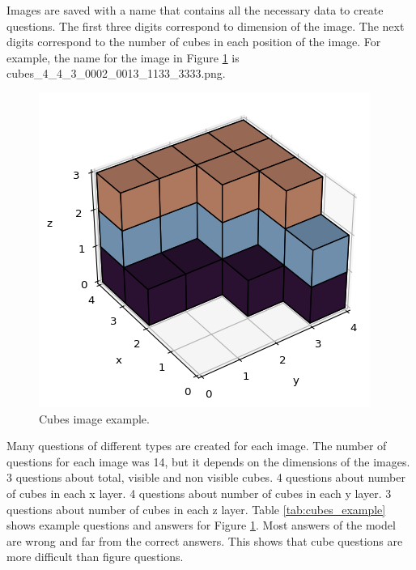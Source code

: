 \documentclass[11pt]{article}
\begin{document}
Images are saved with a name that contains all the necessary data to create questions. The first three digits correspond to dimension of the image. The next digits correspond to the number of cubes in each position of the image. For example, the name for the image in Figure \ref{fig:cubes_example} is cubes\_4\_4\_3\_0002\_0013\_1133\_3333.png.

\begin{figure}[ht]
    \centering
    \includegraphics[width=\linewidth]{cubes_4_4_3_0002_0013_1133_3333.png}
    \caption{Cubes image example.}
    \label{fig:cubes_example}
\end{figure}

Many questions of different types are created for each image. The number of questions for each image was 14, but it depends on the dimensions of the images. 3 questions about total, visible and non visible cubes. 4 questions about number of cubes in each x layer. 4 questions about number of cubes in each y layer. 3 questions about number of cubes in each z layer. Table \ref{tab:cubes_example} shows example questions and answers for Figure \ref{fig:cubes_example}. Most answers of the model are wrong and far from the correct answers. This shows that cube questions are more difficult than figure questions.
\end{document}
